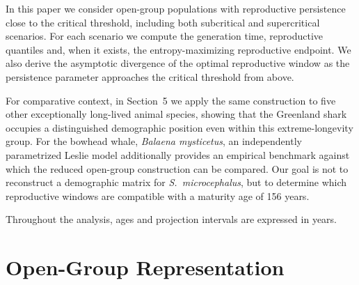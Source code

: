 \documentclass[11pt,a4paper]{amsart}
\begin{document}

In this paper we consider open-group populations with reproductive persistence
close to the critical threshold, including both subcritical and supercritical
scenarios. For each scenario we compute the generation time, reproductive quantiles
and, when it exists, the entropy-maximizing reproductive endpoint. 
We also derive the asymptotic divergence of the optimal reproductive
window as the persistence parameter approaches the critical threshold
from above.

For comparative context, in Section~5 we apply the same construction
to five other exceptionally long-lived animal species, showing that
the Greenland shark occupies a distinguished demographic position even
within this extreme-longevity group. For the bowhead whale,
\textit{Balaena mysticetus}, an independently parametrized Leslie
model additionally provides an empirical benchmark against which the
reduced open-group construction can be compared. Our goal is not to
reconstruct a demographic matrix for \textit{S.~microcephalus}, but
to determine which reproductive windows are compatible with a maturity
age of 156 years.

Throughout the analysis, ages and projection intervals are expressed
in years.

\section{Open-Group Representation}\label{Open-Group Representation}
\end{document}
